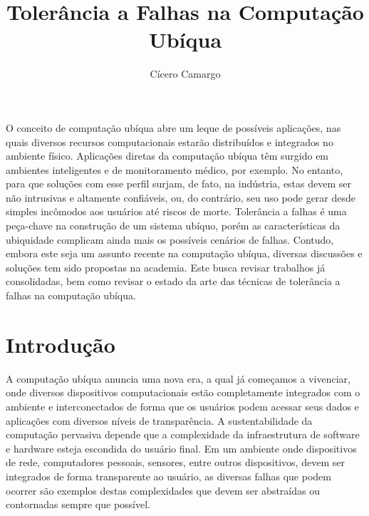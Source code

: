 \documentclass{SBCbookchapter}
\title{Tolerância a Falhas na Computação Ubíqua}
\author{Cícero Camargo}
\begin{document}
\maketitle


\begin{resumo}

O conceito de computação ubíqua abre um leque de possíveis aplicações, nas quais diversos recursos computacionais estarão distribuídos e integrados no ambiente físico. Aplicações diretas da computação ubíqua têm surgido em ambientes inteligentes e de monitoramento médico, por exemplo. No entanto, para que soluções com esse perfil surjam, de fato, na indústria, estas devem ser não intrusivas e altamente confiáveis, ou, do contrário, seu uso pode gerar desde simples incômodos aos usuários até riscos de morte. Tolerância a falhas é uma peça-chave na construção de um sistema ubíquo, porém as características da ubiquidade complicam ainda mais os possíveis cenários de falhas. Contudo, embora este seja um assunto recente na computação ubíqua, diversas discussões e soluções tem sido propostas na academia. Este busca revisar trabalhos já consolidadas, bem como revisar o estado da arte das técnicas de tolerância a falhas na computação ubíqua.

\end{resumo}


\section{Introdução} %

A computação ubíqua anuncia uma nova era, a qual já começamos a vivenciar, onde diversos dispositivos computacionais estão completamente integrados com o ambiente e interconectados de forma que os usuários podem acessar seus dados e aplicações com diversos níveis de transparência. A sustentabilidade da computação pervasiva depende que a complexidade da infraestrutura de software e hardware esteja escondida do usuário final. Em um ambiente onde dispositivos de rede, computadores pessoais, sensores, entre outros dispositivos, devem ser integrados de forma transparente ao usuário, as diversas falhas que podem ocorrer são exemplos destas complexidades que devem ser abstraídas ou contornadas sempre que possível.
\end{document}
